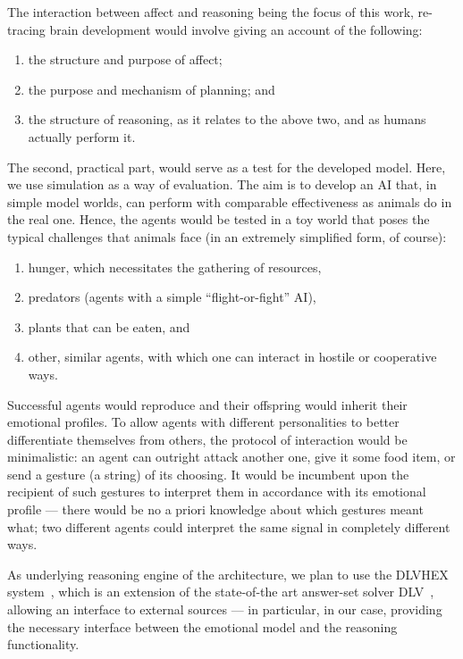 \documentclass[bibliography=totoc ]{scrartcl}
\begin{document}
The interaction between affect and reasoning being the focus of this work, re-tracing brain development would involve giving an account of the following:

\begin{enumerate}
	\item the structure and purpose of affect;
	\item the purpose and mechanism of planning; and
	\item the structure of reasoning, as it relates to the above two, and as humans actually perform it.
\end{enumerate}

The second, practical part, would serve as a test for the developed model. Here, we use simulation as a way of evaluation. The aim is to develop an AI that, in simple model worlds, can perform with comparable effectiveness as animals do in the real one. Hence, the agents would be tested in a toy world that poses the typical challenges that animals face (in an extremely simplified form, of course):

\begin{enumerate}
	\item hunger, which necessitates the gathering of resources,
	\item predators (agents with a simple ``flight-or-fight'' AI),
	\item plants that can be eaten, and
	\item other, similar agents, with which one can interact in hostile or cooperative ways.
\end{enumerate}
Successful agents would reproduce and their offspring would inherit their emotional profiles. To allow agents with different personalities to better differentiate themselves from others, the protocol of interaction would be minimalistic: an agent can outright attack another one, give it some food item, or send a gesture (a string) of its choosing. It would be incumbent upon the recipient of such gestures to interpret them in accordance with its emotional profile --- there would be no a priori knowledge about which gestures meant what; two different agents could interpret the same signal in completely different ways.

As underlying reasoning engine of the architecture, we plan to use the DLVHEX system~\cite{dlvhex}, which is an extension of the state-of-the art answer-set solver DLV~\cite{dlv}, allowing an interface to external sources --- in particular, in our case, providing the necessary interface between the emotional model and the reasoning functionality.
\end{document}
